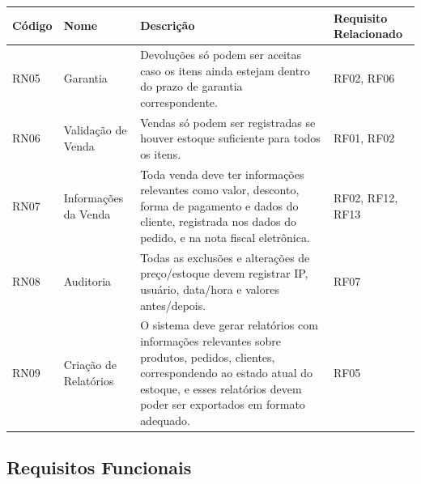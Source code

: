 \documentclass[
	12pt,				%
	openany,			%
	twoside,			%
	a4paper,			%
	english,			%
	brazil				%
	]{abntex2}
\begin{document}
\FloatBarrier


\begin{quadro}[htb]
\centering
\caption{\label{quadro_rn2}Regras de Negócio (RN05 a RN09)}
\hspace*{-1cm}
\begin{tabular}{|p{1.6cm}|p{4.0cm}|p{7.5cm}|p{2.0cm}|}
    \hline
    \textbf{Código} & \textbf{Nome} & \textbf{Descrição} & \textbf{Requisito Relacionado} \\ \hline

 RN05 & Garantia & Devoluções só podem ser aceitas caso os itens ainda estejam dentro do prazo de garantia correspondente. & RF02, RF06 \\ \hline


RN06 & Validação de Venda & Vendas só podem ser registradas se houver estoque suficiente para todos os itens. & RF01, RF02 \\ \hline

RN07 & Informações da Venda & Toda venda deve ter informações relevantes como valor, desconto, forma de pagamento e dados do cliente, registrada nos dados do pedido, e na nota fiscal eletrônica. & RF02, RF12, RF13 \\ \hline

RN08 & Auditoria & Todas as exclusões e alterações de preço/estoque devem registrar IP, usuário, data/hora e valores antes/depois. & RF07 \\ \hline

RN09 & Criação de Relatórios & O sistema deve gerar relatórios com informações relevantes sobre produtos, pedidos, clientes, correspondendo ao estado atual do estoque, e esses relatórios devem poder ser exportados em formato adequado. & RF05 \\ \hline

\end{tabular}
\end{quadro}

\FloatBarrier




\subsection{Requisitos Funcionais}
\end{document}
